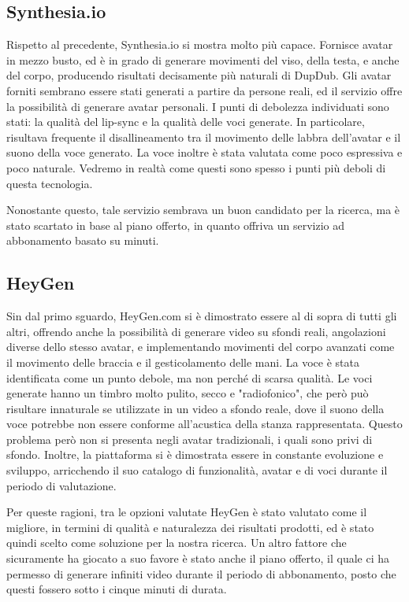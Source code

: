 \subsection{Synthesia.io}

Rispetto al precedente, Synthesia.io si mostra molto più capace. Fornisce avatar in mezzo busto, ed è in grado di generare movimenti del viso, della testa, e anche del corpo, producendo risultati decisamente più naturali di DupDub. Gli avatar forniti sembrano essere stati generati a partire da persone reali, ed il servizio offre la possibilità di generare avatar personali. I punti di debolezza individuati sono stati: la qualità del lip-sync e la qualità delle voci generate. In particolare, risultava frequente il disallineamento tra il movimento delle labbra dell'avatar e il suono della voce generato. La voce inoltre è stata valutata come poco espressiva e poco naturale. Vedremo in realtà come questi sono spesso i punti più deboli di questa tecnologia.

Nonostante questo, tale servizio sembrava un buon candidato per la ricerca, ma è stato scartato in base al piano offerto, in quanto offriva un servizio ad abbonamento basato su minuti. %

\subsection{HeyGen}

Sin dal primo sguardo, HeyGen.com si è dimostrato essere al di sopra di tutti gli altri, offrendo anche la possibilità di generare video su sfondi reali, angolazioni diverse dello stesso avatar, e implementando movimenti del corpo avanzati come il movimento delle braccia e il gesticolamento delle mani. La voce è stata identificata come un punto debole, ma non perché di scarsa qualità. Le voci generate hanno un timbro molto pulito, secco e "radiofonico", che però può risultare innaturale se utilizzate in un video a sfondo reale, dove il suono della voce potrebbe non essere conforme all'acustica della stanza rappresentata. Questo problema però non si presenta negli avatar tradizionali, i quali sono privi di sfondo. Inoltre, la piattaforma si è dimostrata essere in constante evoluzione e sviluppo, arricchendo il suo catalogo di funzionalità, avatar e di voci durante il periodo di valutazione.

Per queste ragioni, tra le opzioni valutate HeyGen è stato valutato come il migliore, in termini di qualità e naturalezza dei risultati prodotti, ed è stato quindi scelto come soluzione per la nostra ricerca. Un altro fattore che sicuramente ha giocato a suo favore è stato anche il piano offerto, il quale ci ha permesso di generare infiniti video durante il periodo di abbonamento, posto che questi fossero sotto i cinque minuti di durata.

